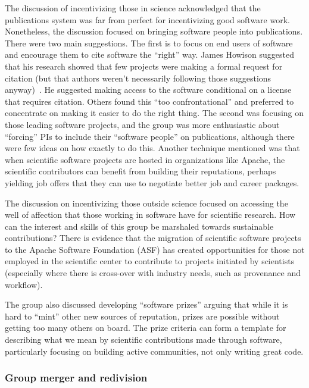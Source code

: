 \documentclass[11pt, oneside]{amsart}
\begin{document}
The discussion of incentivizing those in science acknowledged that the
publications system was far from perfect for incentivizing good software work.
Nonetheless, the discussion focused on bringing software people into publications.
There were two main suggestions. The first is to focus on end users of software
and encourage them to cite software the ``right'' way. James Howison suggested
that his research showed that few projects were making a formal request for
citation (but that authors weren't necessarily following those suggestions
anyway)~\cite{howison2015jasist}. He suggested making access to the software
conditional on a license that requires citation. Others found this ``too
confrontational'' and preferred to concentrate on making it easier to do the
right thing. The second was focusing on those leading software projects, and the
group was more enthusiastic about ``forcing'' PIs to include their ``software
people'' on publications, although there were few ideas on how exactly to do
this. Another technique mentioned was that when scientific software projects are
hosted in organizations like Apache, the scientific contributors can benefit
from building their reputations, perhaps yielding job offers that they can use
to negotiate better job and career packages.

The discussion on incentivizing those outside science focused on accessing the
well of affection that those working in software have for scientific research.
How can the interest and skills of this group be marshaled towards sustainable
contributions? There is evidence that the migration of scientific software
projects to the Apache Software Foundation (ASF) has created opportunities for those not
employed in the scientific center to contribute to projects initiated by
scientists (especially where there is cross-over with industry needs, such as
provenance and workflow).

The group also discussed developing ``software prizes'' arguing that while it is
hard to ``mint'' other new sources of reputation, prizes are possible without
getting too many others on board. The prize criteria can form a template for
describing what we mean by scientific contributions made through software,
particularly focusing on building active communities, not only writing great
code.

\subsubsection{Group merger and redivision}
\end{document}
